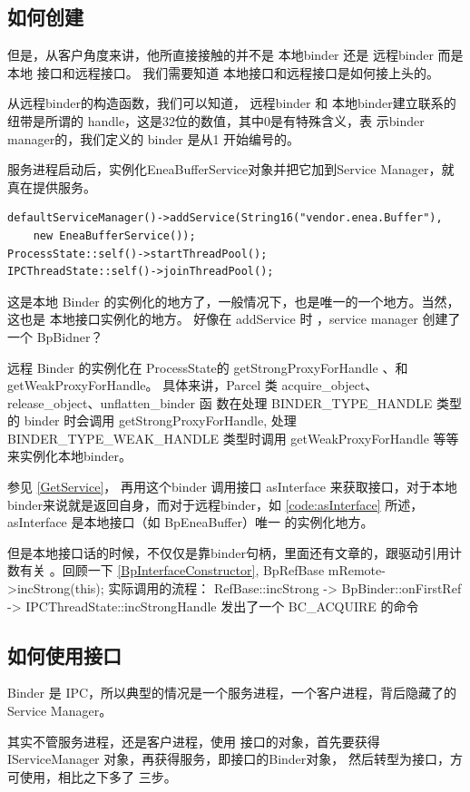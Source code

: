 \documentclass[a4paper,11pt]{article}
\begin{document}
\subsection{如何创建}
但是，从客户角度来讲，他所直接接触的并不是 本地binder 还是 远程binder
而是本地 接口和远程接口。 我们需要知道 本地接口和远程接口是如何接上头的。

从远程binder的构造函数，我们可以知道， 远程binder 和
本地binder建立联系的纽带是所谓的 handle，这是32位的数值，其中0是有特殊含义，表
示binder manager的，我们定义的 binder 是从1 开始编号的。

服务进程启动后，实例化EneaBufferService对象并把它加到Service Manager，就真在提供服务。 
\begin{lstlisting}[label={addservice}]
defaultServiceManager()->addService(String16("vendor.enea.Buffer"),
    new EneaBufferService());
ProcessState::self()->startThreadPool();
IPCThreadState::self()->joinThreadPool();
\end{lstlisting}
这是本地 Binder 的实例化的地方了，一般情况下，也是唯一的一个地方。当然，这也是
本地接口实例化的地方。
好像在 addService 时 ，service manager 创建了一个 BpBidner？

远程 Binder 的实例化在 ProcessState的 getStrongProxyForHandle
\label{code:getStrongProxyForHandle}、和 getWeakProxyForHandle。
具体来讲，Parcel 类 acquire_object、release_object、unflatten_binder 函
数在处理 BINDER_TYPE_HANDLE 类型的 binder 时会调用
getStrongProxyForHandle, 处理 BINDER_TYPE_WEAK_HANDLE 类型时调用
getWeakProxyForHandle 等等来实例化本地binder。

参见 \autoref{GetService}， 再用这个binder 调用接口 asInterface
来获取接口，对于本地binder来说就是返回自身，而对于远程binder，如
\autoref{code:asInterface} 所述，asInterface 是本地接口（如 BpEneaBuffer）唯一
的实例化地方。  

但是本地接口话的时候，不仅仅是靠binder句柄，里面还有文章的，跟驱动引用计数有关
。回顾一下 \autoref{BpInterfaceConstructor},
BpRefBase   mRemote->incStrong(this); 实际调用的流程：
RefBase::incStrong -> BpBinder::onFirstRef -> IPCThreadState::incStrongHandle
发出了一个 BC_ACQUIRE 的命令

\subsection{如何使用接口}
Binder 是 IPC，所以典型的情况是一个服务进程，一个客户进程，背后隐藏了的Service Manager。

其实不管服务进程，还是客户进程，使用 接口的对象，首先要获得IServiceManager
对象，再获得服务，即接口的Binder对象， 然后转型为接口，方可使用，相比之下多了
三步。
\end{document}
